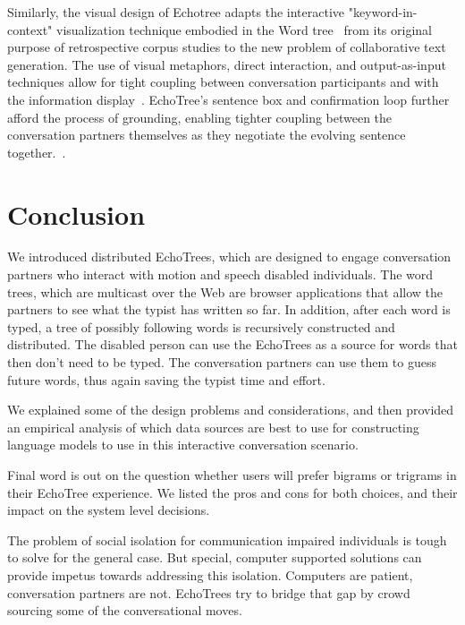 \documentclass{sigchi}
\begin{document}
Similarly, the visual design of Echotree adapts the interactive
"keyword-in-context" visualization technique embodied in the Word
tree~\cite{Wattenberg2008} from its original purpose of retrospective
corpus studies to the new problem of collaborative text
generation. The use of visual metaphors, direct interaction, and
output-as-input techniques allow for tight coupling between
conversation participants and with the information
display~\cite{Ahlberg1994}. EchoTree's sentence box and confirmation
loop further afford the process of grounding, enabling tighter
coupling between the conversation partners themselves as they
negotiate the evolving sentence together.~\cite{clark1991}. 

\section{Conclusion}

We introduced distributed EchoTrees, which are designed to engage
conversation partners who interact with motion and speech disabled
individuals. The word trees, which are multicast over the Web are
browser applications that allow the partners to see what the typist
has written so far. In addition, after each word is typed, a tree of
possibly following words is recursively constructed and distributed. 
The disabled person can use the EchoTrees as a source for words that
then don't need to be typed. The conversation partners can use them to
guess future words, thus again saving the typist time and effort.

We explained some of the design problems and considerations, and then
provided an empirical analysis of which data sources are best to use
for constructing language models to use in this interactive
conversation scenario.

Final word is out on the question whether users will prefer bigrams or
trigrams in their EchoTree experience. We listed the pros and cons for
both choices, and their impact on the system level decisions.

The problem of social isolation for communication impaired individuals
is tough to solve for the general case. But special, computer
supported solutions can provide impetus towards addressing this
isolation. Computers are patient, conversation partners are
not. EchoTrees try to bridge that gap by crowd sourcing some of the
conversational moves.

\end{document}
